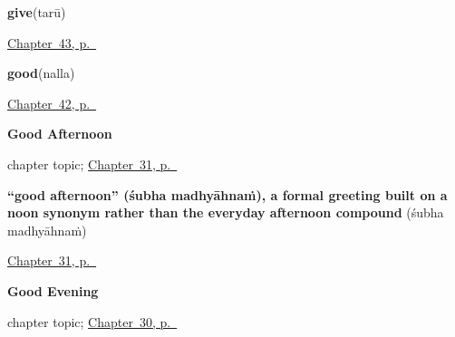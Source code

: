 \noindent\begin{minipage}[t]{\linewidth}
\raggedright
\textbf{give}\enspace\emph{}\enspace(tarū)\par
\footnotesize \hyperref[ch:ml-more-verbs]{Chapter~43, p.~\pageref*{ch:ml-more-verbs}}
\end{minipage}\par\smallskip

\noindent\begin{minipage}[t]{\linewidth}
\raggedright
\textbf{good}\enspace\emph{}\enspace(nalla)\par
\footnotesize \hyperref[ch:ml-describing-things]{Chapter~42, p.~\pageref*{ch:ml-describing-things}}
\end{minipage}\par\smallskip

\noindent\begin{minipage}[t]{\linewidth}
\raggedright
\textbf{Good Afternoon}\par
\footnotesize chapter topic; \hyperref[ch:ml-good-afternoon]{Chapter~31, p.~\pageref*{ch:ml-good-afternoon}}
\end{minipage}\par\smallskip

\noindent\begin{minipage}[t]{\linewidth}
\raggedright
\textbf{\textquotedblleft{}good afternoon\textquotedblright{} (śubha madhyāhnaṁ), a formal greeting built on a noon synonym rather than the everyday afternoon compound}\enspace\emph{ }\enspace(śubha madhyāhnaṁ)\par
\footnotesize \hyperref[ch:ml-good-afternoon]{Chapter~31, p.~\pageref*{ch:ml-good-afternoon}}
\end{minipage}\par\smallskip

\noindent\begin{minipage}[t]{\linewidth}
\raggedright
\textbf{Good Evening}\par
\footnotesize chapter topic; \hyperref[ch:ml-good-evening]{Chapter~30, p.~\pageref*{ch:ml-good-evening}}
\end{minipage}\par\smallskip


